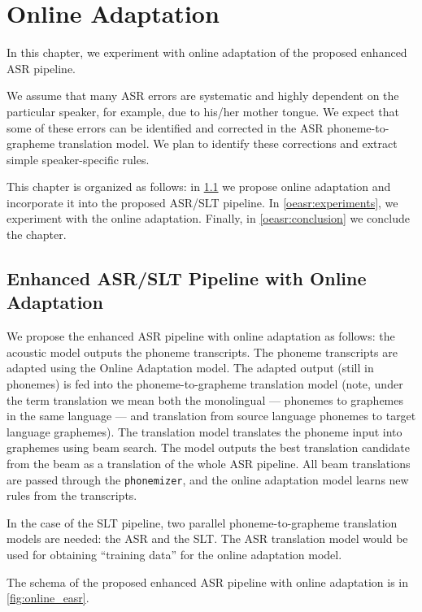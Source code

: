 \chapter{Online Adaptation}
\label{chap:adaptation}
In this chapter, we experiment with online adaptation of the proposed enhanced ASR pipeline.

We assume that many ASR errors are systematic and highly dependent on the particular speaker, for example, due to his/her mother tongue. We expect that some of these errors can be identified and corrected in the ASR phoneme-to-grapheme translation model. We plan to identify these corrections and extract simple speaker-specific rules. %

This chapter is organized as follows: in \cref{oeasr:model} we propose online adaptation and incorporate it into the proposed ASR/SLT pipeline. In \cref{oeasr:experiments}, we experiment with the online adaptation. Finally, in \cref{oeasr:conclusion} we conclude the chapter.

\section{Enhanced ASR/SLT Pipeline with Online Adaptation}
\label{oeasr:model}
We propose the enhanced ASR pipeline with online adaptation as follows: the acoustic model outputs the phoneme transcripts. The phoneme transcripts are adapted using the Online Adaptation model. The adapted output (still in phonemes) is fed into the phoneme-to-grapheme translation model (note, under the term translation we mean both the monolingual --- phonemes to graphemes in the same language --- and translation from source language phonemes to target language graphemes). The translation model translates the phoneme input into graphemes using beam search. The model outputs the best translation candidate from the beam as a translation of the whole ASR pipeline. All beam translations are passed through the \texttt{phonemizer}, and the online adaptation model learns new rules from the transcripts.

In the case of the SLT pipeline, two parallel phoneme-to-grapheme translation models are needed: the ASR and the SLT. The ASR translation model would be used for obtaining ``training data'' for the online adaptation model.

The schema of the proposed enhanced ASR pipeline with online adaptation is in \cref{fig:online_easr}.

